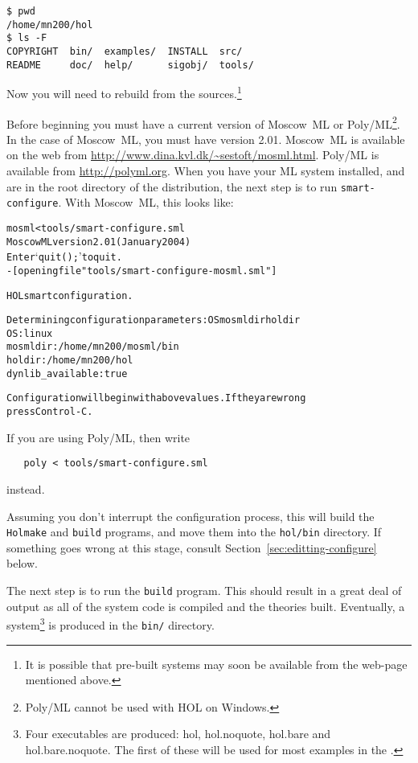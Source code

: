 \setcounter{sessioncount}{0}
\begin{session}
\begin{verbatim}
$ pwd
/home/mn200/hol
$ ls -F
COPYRIGHT  bin/  examples/  INSTALL  src/
README     doc/  help/      sigobj/  tools/
\end{verbatim}
\end{session}

Now you will need to rebuild \HOL{} from the sources.\footnote{It is
  possible that pre-built systems may soon be available from the
  web-page mentioned above.}

Before beginning you must have a current version of Moscow~ML or
Poly/ML\footnote{Poly/ML cannot be used with HOL on Windows.}.  In the
case of Moscow~ML, you must have version 2.01.  Moscow~ML is available
on the web from \url{http://www.dina.kvl.dk/~sestoft/mosml.html}.
Poly/ML is available from \url{http://polyml.org}. When you have your
ML system installed, and are in the root directory of the
distribution, the next step is to run \texttt{smart-configure}.  With
Moscow~ML, this looks like:

\begin{session}
\begin{alltt}
\dol mosml < tools/smart-configure.sml
Moscow ML version 2.01 (January 2004)
Enter `quit();' to quit.
- [opening file "tools/smart-configure-mosml.sml"]

HOL smart configuration.

Determining configuration parameters: OS mosmldir holdir
OS:                 linux
mosmldir:           /home/mn200/mosml/bin
holdir:             /home/mn200/hol
dynlib_available:   true

Configuration will begin with above values.  If they are wrong
press Control-C.
\end{alltt}
\end{session}

If you are using Poly/ML, then write
\begin{verbatim}
   poly < tools/smart-configure.sml
\end{verbatim}
instead.

Assuming you don't interrupt the configuration process, this will
build the \texttt{Holmake} and \texttt{build} programs, and move them
into the \texttt{hol/bin} directory.  If something goes wrong at this
stage, consult Section~\ref{sec:editting-configure} below.

The next step is to run the \texttt{build} program.  This should
result in a great deal of output as all of the system code is compiled
and the theories built.  Eventually, a \HOL{} system\footnote{Four
  \HOL{} executables are produced: \textsf{hol}, \textsf{hol.noquote},
  \textsf{hol.bare} and \textsf{hol.bare.noquote}.  The first of these
  will be used for most examples in the \TUTORIAL{}.} is produced in
the \texttt{bin/} directory.

